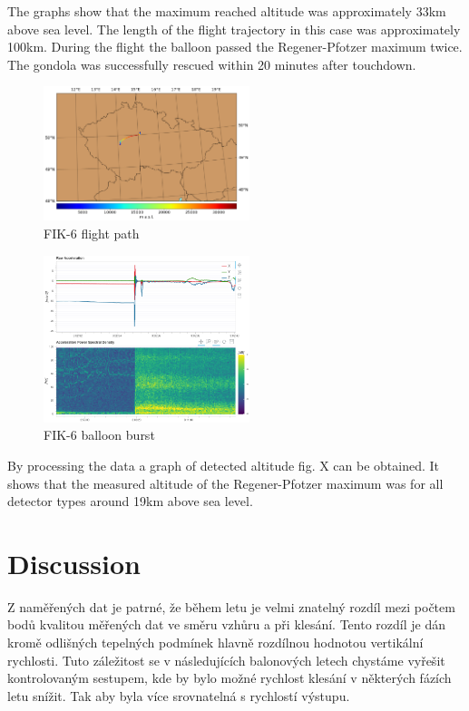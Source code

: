 \documentclass{Rpd}
\begin{document}
The graphs show that the maximum reached altitude was approximately 33km above sea level. The length of the flight trajectory in this case was approximately 100km. During the flight the balloon passed the Regener-Pfotzer maximum twice. The gondola was successfully rescued within 20 minutes after touchdown.


\begin{center}
\begin{figure}%
	\centerline{\includegraphics[width=60mm]{img/FIK-6_flight_path.png}}
	\caption{FIK-6 flight path \label{FIK-6_flight_path}}
\end{figure}
\end{center}

\begin{center}
\begin{figure}%
	\centerline{\includegraphics[width=60mm]{img/FIK-6_balloon_burst.png}}
	\caption{FIK-6 balloon burst \label{FIK-6_balloon_burst}}
\end{figure}
\end{center}

By processing the data a graph of detected altitude fig. X can be obtained. It shows that the measured altitude of the Regener-Pfotzer maximum was for all detector types around 19km above sea level.

\section{Discussion}


Z naměřených dat je patrné, že během letu je velmi znatelný rozdíl mezi počtem bodů kvalitou měřených dat ve směru vzhůru a při klesání. Tento rozdíl je dán kromě odlišných tepelných podmínek hlavně rozdílnou hodnotou vertikální rychlosti.  Tuto záležitost se v následujících balonových letech chystáme vyřešit kontrolovaným sestupem, kde by bylo možné rychlost klesání v některých fázích letu snížit. Tak aby byla více srovnatelná s rychlostí výstupu.
\end{document}
